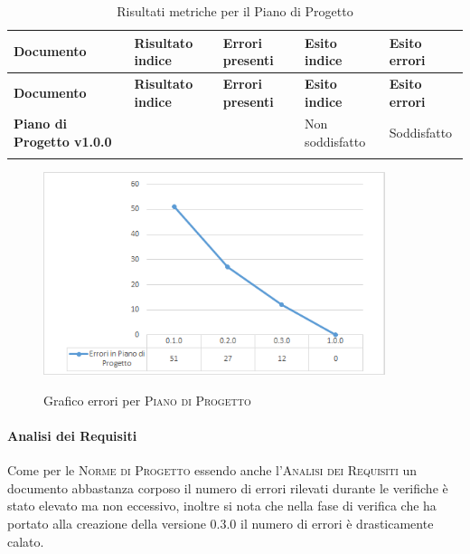 \documentclass[../piano-di-qualifica.tex]{subfiles}
\begin{document}
\renewcommand{\arraystretch}{2} %
\begin{longtable}[H]{>{\centering\bfseries}m{6cm} >{\centering}m{2cm} >{\centering}m{2.5cm} >{\centering}m{2.5cm} >{\centering\arraybackslash}m{2.5cm}}  
  \rowcolor{lightgray}
  {\textbf{Documento}} & {\textbf{Risultato indice}} & {\textbf{Errori presenti}} & {\textbf{Esito indice}} & {\textbf{Esito errori}}  \\
  \endfirsthead%
  \rowcolor{lightgray}
  {\textbf{Documento}} & {\textbf{Risultato indice}} & {\textbf{Errori presenti}} & {\textbf{Esito indice}} & {\textbf{Esito errori}}  \\
  \endhead%
  \textbf{Piano di Progetto v1.0.0} &                  & 0               & Non soddisfatto & Soddisfatto \\
  \caption{Risultati metriche per il Piano di Progetto}
  \label{tab:my-table}
\end{longtable}

\begin{figure}[H]
    \centering
    \includegraphics[width=10cm]{img/erroriPdP.png}
    \label{fig:scice_documenti}
    \caption{Grafico errori per \textsc{Piano di Progetto}}
\end{figure}

\paragraph{Analisi dei Requisiti}
\label{sub:analisi_dei_requisiti}
Come per le \textsc{Norme di Progetto} essendo anche l'\textsc{Analisi dei Requisiti} un documento abbastanza corposo il numero di errori rilevati durante le verifiche è stato elevato ma non eccessivo, inoltre si nota che nella fase di verifica che ha portato alla creazione della versione 0.3.0 il numero di errori è drasticamente calato. 
\end{document}
